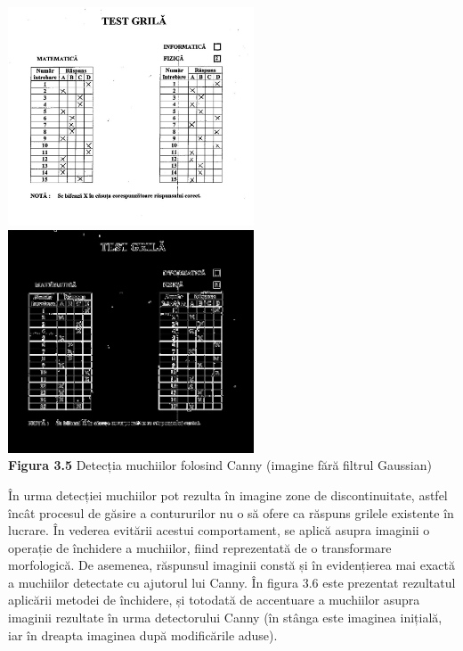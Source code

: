 \documentclass[a4paper,12pt]{report}
\newcommand\tab[1][1cm]{\hspace*{#1}}
\begin{document}
\begin {center} 
	\begin {footnotesize} 
		\includegraphics[width = 73mm]{fig3_5_1} 
		\includegraphics[width = 73mm]{fig3_5_2} \\
		\textbf  {Figura 3.5} Detecția muchiilor folosind Canny (imagine fără filtrul Gaussian)
	\end {footnotesize} 
\end {center}
\tab În urma detecției muchiilor pot rezulta în imagine zone de discontinuitate, astfel încât procesul de găsire a contururilor nu o să ofere ca răspuns grilele existente în lucrare. În vederea evitării acestui comportament, se aplică asupra imaginii o operație de închidere a muchiilor, fiind reprezentată de o transformare morfologică. De asemenea, răspunsul imaginii constă și în evidențierea mai exactă a muchiilor detectate cu ajutorul lui Canny. În figura 3.6 este prezentat rezultatul aplicării metodei de închidere, și totodată de accentuare a muchiilor asupra imaginii rezultate în urma detectorului Canny (în stânga este imaginea inițială, iar în dreapta imaginea după modificările aduse).
\end{document}
